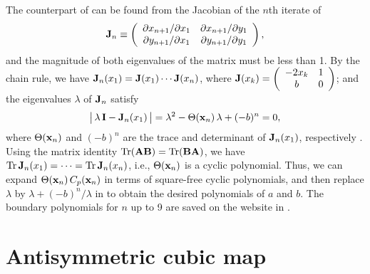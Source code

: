 \documentclass{ws-ijbc}
\begin{document}
The counterpart of 
  can be found from the Jacobian of the $n$th iterate of 
\[
  \mathbf{J}_n
  \equiv
  \left(
    \begin{array}{ccc}
      \partial x_{n+1}/\partial x_1 & \partial x_{n+1}/\partial y_1 \\
      \partial y_{n+1}/\partial x_1 & \partial y_{n+1}/\partial y_1 \\
    \end{array}
  \right),
\]
and the magnitude of both eigenvalues of the matrix must be less than 1.
By the chain rule, we have
  $\mathbf{J}_n (x_1) = \mathbf{J}(x_1) \cdots \mathbf{J}(x_n)$,
  where
$\mathbf{J}(x_k)
  =
  \left(
    \begin{array}{cc}
      -2 x_k & 1 \\
      b & 0
    \end{array}
  \right)$;
and the eigenvalues $\lambda$ of $\mathbf{J}_n$ satisfy
%
\begin{equation}
\big|\, \lambda \, \mathbf{I} - \mathbf{J}_n(x_1) \,\big|
= \lambda^2 - \Theta(\mathbf{x}_{n}) \,\lambda +(-b)^n = 0,
\notag
\end{equation}
%
where $\Theta(\mathbf{x}_{n})$ and $(-b)^n$
  are the trace and determinant of $\mathbf{J}_n(x_1)$,
  respectively \cite{huang, hitzl}.
%
%
Using the matrix identity $\mathrm{Tr}( \mathbf{A} \mathbf{B}) = \mathrm{Tr}(\mathbf{B} \mathbf{A})$,
  we have
    $\mathrm{Tr} \, \mathbf{J}_n(x_1) = \cdots = \mathrm{Tr} \, \mathbf{J}_n(x_n)$,
  i.e., $\Theta(\mathbf{x}_{n})$ is a cyclic polynomial. %
%
  Thus, we can expand $\Theta(\mathbf{x}_{n}) \, C_p(\mathbf{x}_{n})$
  in terms of square-free cyclic polynomials,
  and then replace $\lambda$ by $\lambda + (-b)^n/\lambda$
  in 
  to obtain the desired polynomials of $a$ and $b$.
%
%
%
The boundary polynomials
  for $n$ up to 9 are saved on the website in .











\section{\label{sec:cubic}Antisymmetric cubic map}
\end{document}
